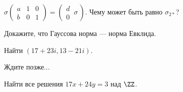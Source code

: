 \documentclass[12pt,a4paper]{article}
\begin{document}
    \begin{exercise}
        $\sigma \left(\begin{smallmatrix}
            a & 1 & 0\\ b & 0 & 1
        \end{smallmatrix}\right) = \left(\begin{smallmatrix}
            d \\ 0
        \end{smallmatrix}\,\sigma\,\right)$. Чему может быть равно $\sigma_{2*}$?
    \end{exercise}

    \begin{exercise}
        Докажите, что Гауссова норма --- норма Евклида.
    \end{exercise}

    \begin{exercise}
        Найти $(17 + 23i, 13 - 21i)$.
    \end{exercise}

    \begin{exercise}
        Ждите позже...
    \end{exercise}

    \begin{exercise}
        Найти все решения $17 x + 24 y = 3$ над $\ZZ$.
    \end{exercise}
\end{document}

